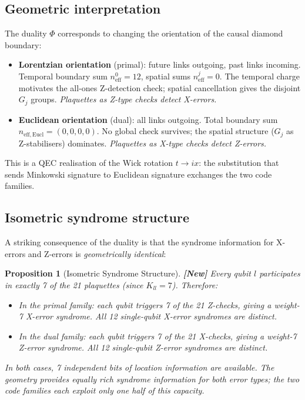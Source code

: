 \documentclass[12pt,a4paper]{article}
\theoremstyle{plain}
\newtheorem{proposition}[theorem]{Proposition}
\theoremstyle{definition}
\theoremstyle{remark}
\newcommand{\NEW}{\textcolor{newcolor}{\textbf{[New]}}}
\begin{document}
\subsection{Geometric interpretation}

The duality $\Phi$ corresponds to changing the orientation of the
causal diamond boundary:

\begin{itemize}[noitemsep]
\item \textbf{Lorentzian orientation} (primal): future links outgoing,
  past links incoming. Temporal boundary sum $n_{\mathrm{eff}}^0 = 12$,
  spatial sums $n_{\mathrm{eff}}^j = 0$.
  The temporal charge motivates the all-ones Z-detection check;
  spatial cancellation gives the disjoint $G_j$ groups.
  \emph{Plaquettes as Z-type checks detect X-errors.}
\item \textbf{Euclidean orientation} (dual): all links outgoing.
  Total boundary sum $n_{\mathrm{eff},\mathrm{Eucl}} = (0,0,0,0)$.
  No global check survives; the spatial structure ($G_j$ as
  Z-stabilisers) dominates.
  \emph{Plaquettes as X-type checks detect Z-errors.}
\end{itemize}

This is a QEC realisation of the Wick rotation $t \to ix$: the
substitution that sends Minkowski signature to Euclidean signature
exchanges the two code families.

\subsection{Isometric syndrome structure}

A striking consequence of the duality is that the syndrome information
for X-errors and Z-errors is \emph{geometrically identical}:

\begin{proposition}[Isometric Syndrome Structure]\label{prop:isometric}
\NEW\; Every qubit $l$ participates in exactly 7 of the 21 plaquettes
(since $K_{ll}=7$). Therefore:
\begin{itemize}[noitemsep]
\item In the primal family: each qubit triggers 7 of the 21 Z-checks,
  giving a weight-7 X-error syndrome. All 12 single-qubit X-error
  syndromes are distinct.
\item In the dual family: each qubit triggers 7 of the 21 X-checks,
  giving a weight-7 Z-error syndrome. All 12 single-qubit Z-error
  syndromes are distinct.
\end{itemize}
In both cases, 7 independent bits of location information are available.
The geometry provides equally rich syndrome information for both error
types; the two code families each exploit only one half of this capacity.
\end{proposition}
\end{document}
